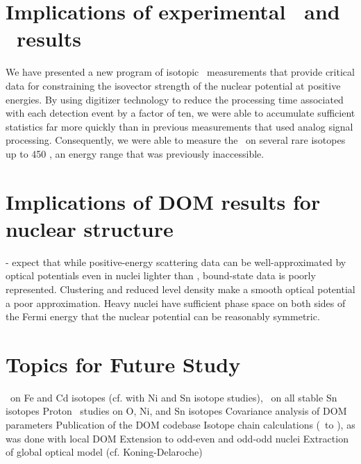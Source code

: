 \section{Implications of experimental \tot\ and \el\ results}
We have presented a new program of isotopic \tot\ measurements that provide critical data for
constraining the isovector strength of the nuclear potential at positive energies. By using
digitizer technology to reduce the processing time associated with each detection event by a factor
of ten, we were able to accumulate sufficient statistics far more quickly than in previous
measurements that used analog signal processing. Consequently, we were able to measure the \tot\ on
several rare isotopes up to 450 \mega\electronvolt, an energy range that was previously inaccessible.

\section{Implications of DOM results for nuclear structure}
- expect that while positive-energy scattering data can be well-approximated by
optical potentials even in nuclei lighter than \oSix, bound-state data is poorly
represented. Clustering and reduced level density make a smooth optical
potential a poor approximation. Heavy nuclei have sufficient phase space on both
sides of the Fermi energy that the nuclear potential can be reasonably
symmetric.

\section{Topics for Future Study}
\tot\ on Fe and Cd isotopes (cf. with Ni and Sn isotope studies), \tot\ on all stable Sn isotopes
Proton \rxn\ studies on O, Ni, and Sn isotopes
Covariance analysis of DOM parameters
Publication of the DOM codebase
Isotope chain calculations (\snTwelve\ to \snFour), as was done with local DOM
Extension to odd-even and odd-odd nuclei
Extraction of global optical model (cf. Koning-Delaroche)

